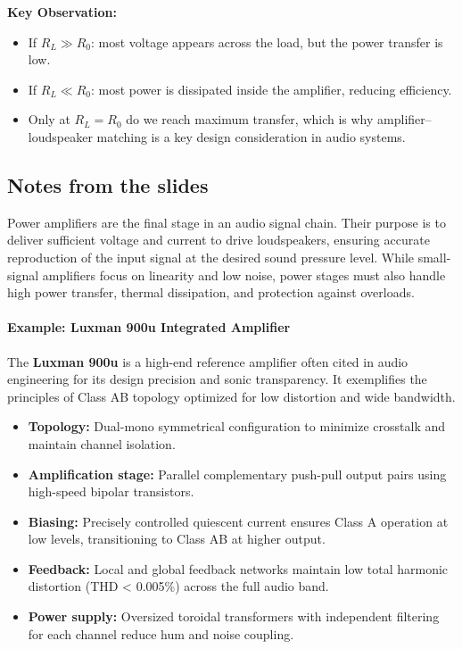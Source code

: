 \textbf{Key Observation:}
\begin{itemize}
    \item If $R_L \gg R_0$: most voltage appears across the load, but the power transfer is low.  
    \item If $R_L \ll R_0$: most power is dissipated inside the amplifier, reducing efficiency.
    \item Only at $R_L = R_0$ do we reach maximum transfer, which is why amplifier–loudspeaker matching is a key design consideration in audio systems.
\end{itemize} 

\subsection{Notes from the slides}
Power amplifiers are the final stage in an audio signal chain.  
Their purpose is to deliver sufficient voltage and current to drive loudspeakers, ensuring accurate reproduction of the input signal at the desired sound pressure level.  
While small-signal amplifiers focus on linearity and low noise, power stages must also handle high power transfer, thermal dissipation, and protection against overloads.


\paragraph{Example: Luxman 900u Integrated Amplifier}
The \textbf{Luxman 900u} is a high-end reference amplifier often cited in audio engineering for its design precision and sonic transparency.  
It exemplifies the principles of Class AB topology optimized for low distortion and wide bandwidth.

\begin{itemize}
  \item \textbf{Topology:} Dual-mono symmetrical configuration to minimize crosstalk and maintain channel isolation.
  \item \textbf{Amplification stage:} Parallel complementary push-pull output pairs using high-speed bipolar transistors.
  \item \textbf{Biasing:} Precisely controlled quiescent current ensures Class A operation at low levels, transitioning to Class AB at higher output.
  \item \textbf{Feedback:} Local and global feedback networks maintain low total harmonic distortion (THD < 0.005\%) across the full audio band.
  \item \textbf{Power supply:} Oversized toroidal transformers with independent filtering for each channel reduce hum and noise coupling.
\end{itemize}


